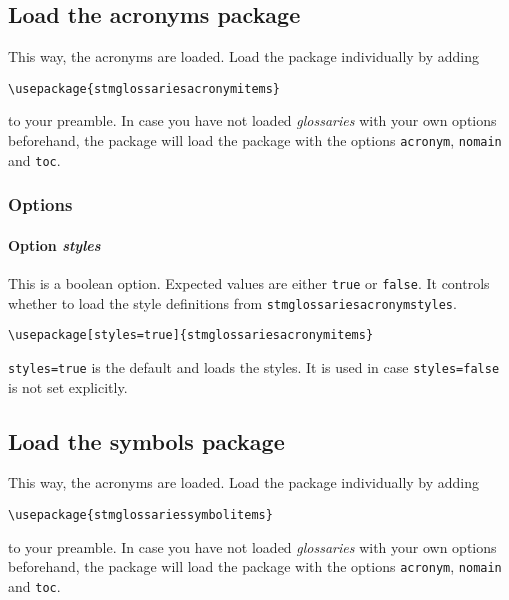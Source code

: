 \documentclass{scrartcl}
\begin{document}
\subsection{Load the acronyms package}
\label{sec:usage:preamble:acronymspackage}

This way, the acronyms are loaded. Load the package individually by adding

\begin{verbatim}
\usepackage{stmglossariesacronymitems}
\end{verbatim}

to your preamble. In case you have not loaded \textit{glossaries} with your own options beforehand, the package will load the package with the options \texttt{acronym}, \texttt{nomain} and \texttt{toc}.

\subsubsection{Options}

\paragraph{Option \protect\textit{styles}}

This is a boolean option. Expected values are either \texttt{true} or \texttt{false}. It controls whether to load the style definitions from \texttt{stmglossariesacronymstyles}.

\begin{verbatim}
\usepackage[styles=true]{stmglossariesacronymitems}
\end{verbatim}

\texttt{styles=true} is the default and loads the styles. It is used in case \texttt{styles=false} is not set explicitly.

\subsection{Load the symbols package}
\label{sec:usage:preamble:symbolspackage}

This way, the acronyms are loaded. Load the package individually by adding

\begin{verbatim}
\usepackage{stmglossariessymbolitems}
\end{verbatim}

to your preamble. In case you have not loaded \textit{glossaries} with your own options beforehand, the package will load the package with the options \texttt{acronym}, \texttt{nomain} and \texttt{toc}.
\end{document}
